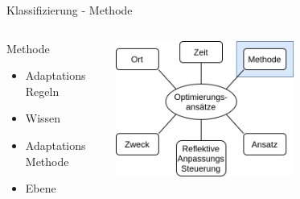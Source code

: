 \documentclass[de,16:9]{sdqbeamer}
\begin{document}
\begin{frame}{Klassifizierung - Methode}
	\begin{columns}
		 \begin{center}
			\begin{greenblock}{Methode}
				\begin{itemize}
					\item Adaptations Regeln
					\item Wissen
					\item Adaptations Methode
					\item Ebene
				\end{itemize}
			\end{greenblock}
		\end{center}
		 \begin{center}
			\includegraphics[width=0.6\textwidth]{sources/ClassificationProposal-Proposal_DE_Technique.png}
		\end{center}
	\end{columns}
\end{frame}
\end{document}

